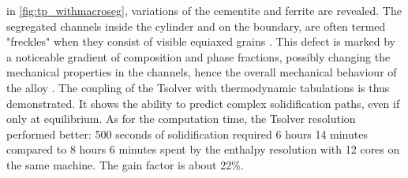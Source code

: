 in \cref{fig:tp_withmacroseg}, variations of the cementite and ferrite are revealed. 
The segregated channels inside the cylinder and on the boundary, are often termed "freckles" when they consist of visible equiaxed grains \citep{copley_origin_1970}.
This defect is marked by a noticeable gradient of composition and phase fractions, possibly changing the mechanical 
properties in the channels, hence the overall mechanical behaviour of the alloy . The coupling of the Tsolver with 
thermodynamic tabulations is thus demonstrated. It shows the ability to predict complex solidification paths, even if 
only at equilibrium. As for the computation time, the Tsolver resolution performed better: 500 seconds of solidification 
required 6 hours 14 minutes compared to 8 hours 6 minutes spent by the enthalpy resolution with 12 cores on the same machine. 
The gain factor is about 22\%.
%
